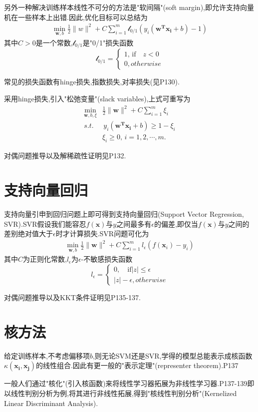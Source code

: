 另外一种解决训练样本线性不可分的方法是"软间隔"(soft margin),即允许支持向量机在一些样本上出错.因此,优化目标可以总结为
\begin{equation}\begin{split}
\min_{\mathbf w,b}\frac{1}{2}\|w\|^2+C\sum_{i=1}^m\mathcal l_{0/1}(y_i(\mathbf{w^Tx_i}+b)-1)
\end{split}\end{equation}
其中$C>0$是一个常数,$\mathcal l_{0/1}$是"0/1"损失函数
\begin{equation}\mathcal l_{0/1}=\left\{\begin{array}{ll}
1,\,\text{if}\quad z<0\\
0,otherwise
\end{array}\right.\end{equation}

常见的损失函数有hinge损失,指数损失,对率损失(见P130).

采用hinge损失,引入"松弛变量"(slack variables),上式可重写为
\begin{equation}\begin{split}
\min_{\mathbf w,b,\xi}&\frac{1}{2}\|\mathbf w\|^2+C\sum_{i=1}^m\xi_i\\
s.t.&\,y_i(\mathbf{w^Tx_i}+b)\ge1-\xi_i\\
&\xi_i\ge0,\,i=1,2,\cdots,m.
\end{split}\end{equation}

对偶问题推导以及解稀疏性证明见P132.

\section{支持向量回归}

支持向量引申到回归问题上即可得到支持向量回归(Support Vector Regression, SVR).SVR假设我们能容忍$f(\mathbf x)$与$y$之间最多有$\epsilon$的偏差,即仅当$f(\mathbf x)$与$y$之间的差别绝对值大于$\epsilon$时才计算损失.SVR问题可化为
\begin{equation}\begin{split}
\min_{\mathbf w,b}\frac{1}{2}\|\mathbf w\|^2+C\sum_{i=1}^ml_\epsilon(f(\mathbf x_i)-y_i)
\end{split}\end{equation}
其中$C$为正则化常数,$l_\epsilon$为$\epsilon$-不敏感损失函数
\begin{equation}l_\epsilon=\left\{\begin{array}{ll}
0,\quad\text{if}|z|\le\epsilon\\
|z|-\epsilon,otherwise
\end{array}\right.\end{equation}

对偶问题推导以及KKT条件证明见P135-137.

\section{核方法}

给定训练样本,不考虑偏移项$b$,则无论SVM还是SVR,学得的模型总能表示成核函数$\kappa(\mathbf{x_i,x_j})$的线性组合.因此有更一般的"表示定理"(representer theorem).P137

一般人们通过"核化"(引入核函数)来将线性学习器拓展为非线性学习器.P137-139即以线性判别分析为例,将其进行非线性拓展,得到"核线性判别分析"(Kernelized Linear Discriminant Analysis).